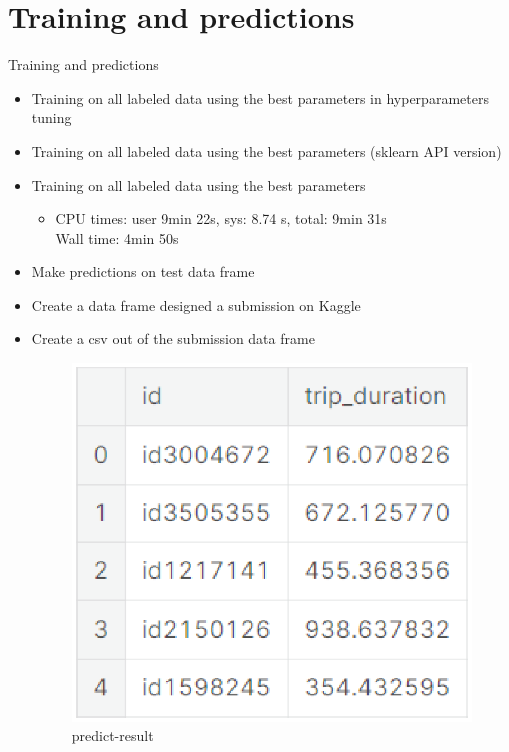 \documentclass[
 size=14pt,
 paper=smartboard,  %
 mode=present, 		%
 display=slides, 	%
 style=tuliplab,  	%
 pauseslide,
 fleqn,leqno]{powerdot}
\begin{document}
\section{Training and predictions}
\begin{slide}{Training and predictions}
\begin{itemize}
\item
Training on all labeled data using the best parameters in hyperparameters tuning
\item 
Training on all labeled data using the best parameters (sklearn API version)
\item 
Training on all labeled data using the best parameters
\begin{itemize}
\item
CPU times: user 9min 22s, sys: 8.74 s, total: 9min 31s\\
Wall time: 4min 50s
\end{itemize}
\item
Make predictions on test data frame
\item 
Create a data frame designed a submission on Kaggle
\item 
Create a csv out of the submission data frame

\begin{figure}
\includegraphics[scale=0.4]{predict_result.eps}
\caption{predict-result}
\end{figure}
\end{itemize}

\end{slide}
\end{document}
